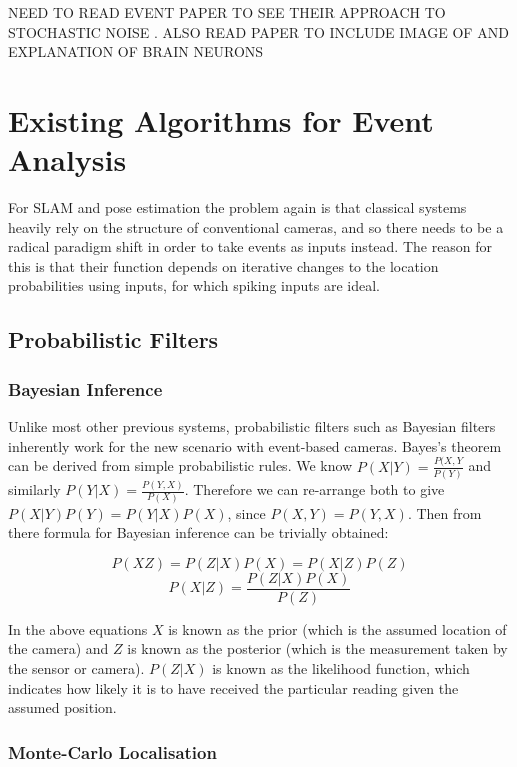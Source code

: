 \color{red} NEED TO READ EVENT PAPER TO SEE THEIR APPROACH TO STOCHASTIC NOISE \cite{EventBasedVisionASurvery}. ALSO READ PAPER\cite{NeuralHetroPromRobLearn} TO INCLUDE IMAGE OF AND EXPLANATION OF BRAIN NEURONS \color{black}

\section{Existing Algorithms for Event Analysis}

For SLAM and pose estimation the problem again is that classical systems heavily rely on the structure of conventional cameras, and so there needs to be a radical paradigm shift in order to take events as inputs instead. The reason for this is that their function depends on iterative changes to the location probabilities using inputs, for which spiking inputs are ideal.

\subsection{Probabilistic Filters}

\subsubsection{Bayesian Inference}

Unlike most other previous systems, probabilistic filters such as Bayesian filters inherently work for the new scenario with event-based cameras. Bayes's theorem can be derived from simple probabilistic rules\cite{BayesLaw}. We know $P(X|Y) = \frac{P(X, Y}{P(Y)} $ and similarly $ P(Y|X) = \frac{P(Y, X)}{P(X)} $. Therefore we can re-arrange both to give $ P(X|Y)P(Y) = P(Y|X)P(X) $, since $ P(X, Y) = P(Y, X) $. Then from there formula for Bayesian inference can be trivially obtained:

$$ P(XZ) = P(Z|X)P(X) = P(X|Z)P(Z) $$
$$ P(X|Z) = \frac{P(Z|X)P(X)}{P(Z)}$$

In the above equations $ X $ is known as the prior (which is the assumed location of the camera) and $ Z $ is known as the posterior (which is the measurement taken by the sensor or camera). $P(Z|X) $ is known as the likelihood function, which indicates how likely it is to have received the particular reading given the assumed position.

\subsubsection{Monte-Carlo Localisation}

